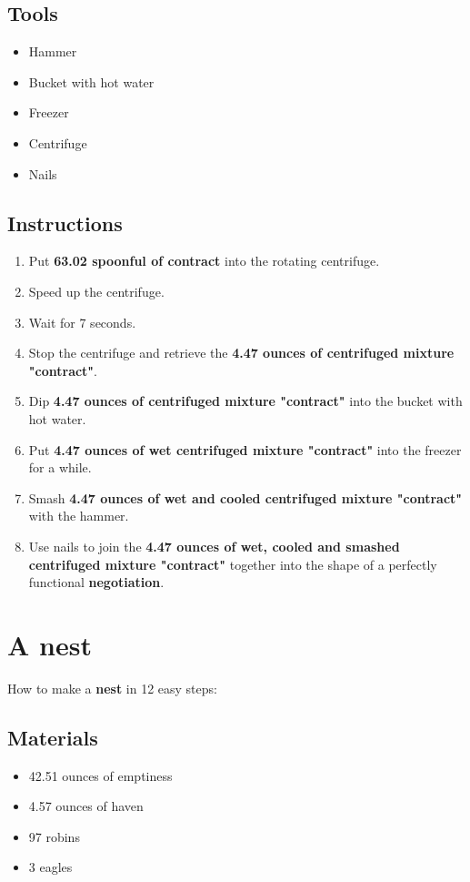 \documentclass{article}
\begin{document}
\subsection{Tools}\begin{itemize}
\item 
Hammer
\item 
Bucket with hot water
\item 
Freezer
\item 
Centrifuge
\item 
Nails
\end{itemize}
\subsection{Instructions}\begin{enumerate}
\item 
Put \textbf{63.02 spoonful of contract} into the rotating centrifuge.
\item 
Speed up the centrifuge.
\item 
Wait for 7 seconds.
\item 
Stop the centrifuge and retrieve the \textbf{4.47 ounces of centrifuged mixture "contract"}.
\item 
Dip \textbf{4.47 ounces of centrifuged mixture "contract"} into the bucket with hot water.
\item 
Put \textbf{4.47 ounces of wet centrifuged mixture "contract"} into the freezer for a while.
\item 
Smash \textbf{4.47 ounces of wet and cooled centrifuged mixture "contract"} with the hammer.
\item 
Use nails to join the \textbf{4.47 ounces of wet, cooled and smashed centrifuged mixture "contract"} together into the shape of a perfectly functional \textbf{negotiation}.
\end{enumerate}
\newpage
\section{A nest}How to make a \textbf{nest} in 12 easy steps:

\subsection{Materials}\begin{itemize}
\item 
42.51 ounces of emptiness
\item 
4.57 ounces of haven
\item 
97 robins
\item 
3 eagles
\end{itemize}
\end{document}
